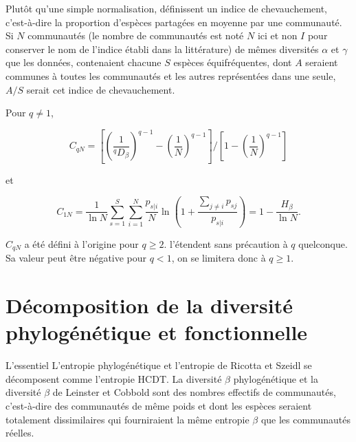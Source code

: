 \documentclass[
  11pt,
  french,
  a4paper,
  extrafontsizes,onecolumn,openright
  ]{memoir}
\newenvironment{Essentiel}
  {\begin{bclogo}[logo=\bctrombone, noborder=true, couleur=lightgray!50]{L'essentiel}\parindent0pt}
  {\end{bclogo}}
\begin{document}
Plutôt qu'une simple normalisation, \textcite{Chao2008} définissent un indice de chevauchement, c'est-à-dire la proportion d'espèces partagées en moyenne par une communauté.
Si \(N\) communautés (le nombre de communautés est noté \(N\) ici et non \(I\) pour conserver le nom de l'indice établi dans la littérature) de mêmes diversités \(\alpha\) et \(\gamma\) que les données, contenaient chacune \(S\) espèces équifréquentes, dont \(A\) seraient communes à toutes les communautés et les autres représentées dans une seule, \(A/S\) serait cet indice de chevauchement.

Pour \(q\ne 1\),

\begin{equation}
  \label{eq:Chao2008q}
  C_{qN} = {\left[{\left(\frac{1}{^{q}\!D_{\beta}}\right)}^{q-1}-{\left(\frac{1}{N}\right)}^{q-1}\right]}/{\left[1-{\left(\frac{1}{N}\right)}^{q-1}\right]}
\end{equation}

et

\begin{equation}
  \label{eq:C1N}
  C_{1N} 
  =\frac{1}{\ln{N}}\sum^S_{s=1}{\sum^N_{i=1}{\frac{p_{s|i}}{N}\ln\left(1+\frac{\sum_{j\ne i}{p_{sj}}}{p_{s|i}}\right)}}
  =1-\frac{H_{\beta}}{\ln{N}}.
\end{equation}

\(C_{qN}\) a été défini à l'origine pour \(q\ge 2\).
\textcite{Chao2012a} l'étendent sans précaution à \(q\) quelconque.
Sa valeur peut être négative pour \(q<1\), on se limitera donc à \(q \ge 1\).

\hypertarget{duxe9composition-de-la-diversituxe9-phyloguxe9nuxe9tique-et-fonctionnelle}{%
\chapter{Décomposition de la diversité phylogénétique et fonctionnelle}\label{duxe9composition-de-la-diversituxe9-phyloguxe9nuxe9tique-et-fonctionnelle}}

\scriptsize

\begin{Essentiel}
L'entropie phylogénétique et l'entropie de Ricotta et Szeidl se
décomposent comme l'entropie HCDT. La diversité \(\beta\) phylogénétique
et la diversité \(\beta\) de Leinster et Cobbold sont des nombres
effectifs de communautés, c'est-à-dire des communautés de même poids et
dont les espèces seraient totalement dissimilaires qui fourniraient la
même entropie \(\beta\) que les communautés réelles.
\end{Essentiel}
\end{document}
